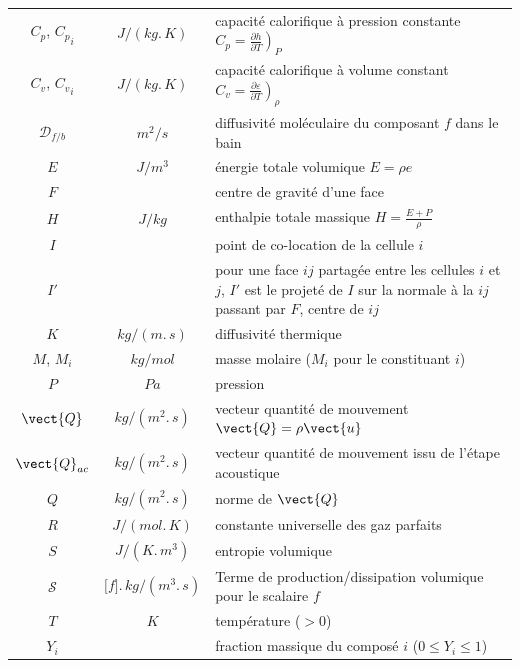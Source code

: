 \begin{table}[h!]
\begin{tabular}{ccp{}}
$C_p$, ${C_p}_i$ & $J/(kg.\,K)$        & capacité calorifique à pression constante
        $C_p = \left.\frac{\partial h}{\partial T}\right)_P$\\
$C_v$, ${C_v}_i$ & $J/(kg.\,K)$        & capacité calorifique à volume constant
        $C_v = \left.\frac{\partial \varepsilon}{\partial T}\right)_\rho$\\
$\mathcal{D}_{f/b}$ & $m^2/s$         & diffusivité moléculaire du composant $f$
                                        dans le bain\\
$E$                 & $J/m^3$        & énergie totale volumique $E = \rho e$\\
$F$                 &                  & centre de gravité d'une face\\
$H$                 & $J/kg$         & enthalpie totale massique
                                        $H = \frac{E+P}{\rho}$\\
$I$                 &                  & point de co-location de la cellule $i$\\
$I'$                 &                  & pour une face $ij$ partagée entre les
                                        cellules $i$ et $j$, $I'$
                                        est le projeté de $I$ sur la
                                        normale à la $ij$ passant
                                        par $F$, centre de $ij$\\
$K$                 & $kg/(m.\,s)$         & diffusivité thermique\\
$M$, $M_i$         & $kg/mol$         & masse molaire ($M_i$ pour le constituant $i$)\\
$P$                 & $Pa$                 & pression\\
$\vect{Q}$         & $kg/(m^2.\,s)$& vecteur quantité de mouvement
                                        $\vect{Q} = \rho\vect{u}$\\
$\vect{Q}_{ac}$ & $kg/(m^2.\,s)$& vecteur quantité de mouvement issu
                                        de l'étape acoustique\\
$Q$                 & $kg/(m^2.\,s)$& norme de $\vect{Q}$\\
$R$                 & $J/(mol.\,K)$ & constante universelle des gaz parfaits\\
$S$                 & $J/(K.\,m^3)$        & entropie volumique\\
$\mathcal{S}$         & $\lbrack f\rbrack.\,kg/(m^3.\,s)$
                                & Terme de production/dissipation volumique
                                        pour le scalaire $f$\\
$T$                 & $K$                 & température ($>0$)\\
$Y_i$                 &                 & fraction massique du composé $i$
                                        ($0 \leqslant Y_i \leqslant 1$)\\
\end{tabular}
\end{table}

